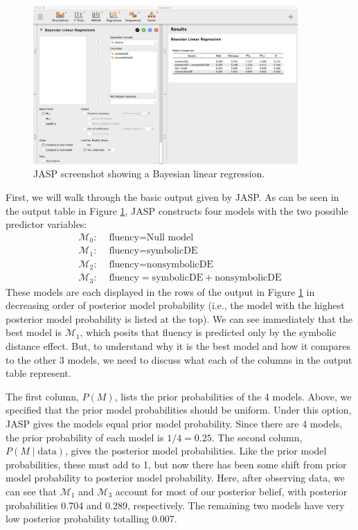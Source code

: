 \documentclass[english,,doc,floatsintext]{apa6}
\begin{document}
\begin{figure}
\centering
\includegraphics[width=0.9\textwidth,height=\textheight]{figures/regression1.png}
\caption{\label{fig:regression1}JASP screenshot showing a Bayesian linear regression.}
\end{figure}

First, we will walk through the basic output given by JASP. As can be seen in the output table in Figure \ref{fig:regression1}, JASP constructs four models with the two possible predictor variables:
\begin{align*}
\mathcal{M}_{0}: & \text{ fluency} = \text{Null model} \\
\mathcal{M}_{1}: & \text{ fluency} = \text{symbolicDE} \\
\mathcal{M}_{2}: & \text{ fluency} = \text{nonsymbolicDE} \\
\mathcal{M}_{3}: & \text{ fluency} = \text{symbolicDE}+\text{nonsymbolicDE}
\end{align*}
These models are each displayed in the rows of the output in Figure \ref{fig:regression1} in decreasing order of posterior model probability (i.e., the model with the highest posterior model probability is listed at the top). We can see immediately that the best model is \(\mathcal{M}_{1}\), which posits that fluency is predicted only by the symbolic distance effect. But, to understand why it is the best model and how it compares to the other 3 models, we need to discuss what each of the columns in the output table represent.

The first column, \(P(M)\), lists the prior probabilities of the 4 models. Above, we specified that the prior model probabilities should be uniform. Under this option, JASP gives the models equal prior model probability. Since there are 4 models, the prior probability of each model is \(1/4 = 0.25\). The second column, \(P(M\mid \text{data})\), gives the posterior model probabilities. Like the prior model probabilities, these must add to 1, but now there has been some shift from prior model probability to posterior model probability. Here, after observing data, we can see that \(\mathcal{M}_{1}\) and \(\mathcal{M}_{3}\) account for most of our posterior belief, with posterior probabilities 0.704 and 0.289, respectively. The remaining two models have very low posterior probability totalling 0.007.
\end{document}
